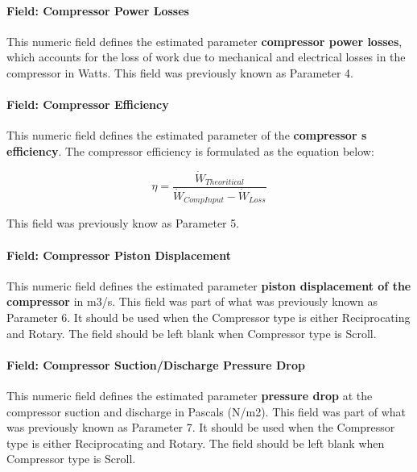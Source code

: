 \paragraph{Field: Compressor Power Losses}\label{field-compressor-power-losses}

This numeric field defines the estimated parameter \textbf{compressor power losses}, which accounts for the loss of work due to mechanical and electrical losses in the compressor in Watts. This field was previously known as Parameter 4.

\paragraph{Field: Compressor Efficiency}\label{field-compressor-efficiency}

This numeric field defines the estimated parameter of the \textbf{compressor s efficiency}. The compressor efficiency is formulated as the equation below:

\begin{equation}
\eta  = \frac{{{{\dot W}_{Theoritical}}}}{{{{\dot W}_{CompInput}} - {{\dot W}_{Loss}}}}
\end{equation}

This field was previously know as Parameter 5.

\paragraph{Field: Compressor Piston Displacement}\label{field-compressor-piston-displacement}

This numeric field defines the estimated parameter \textbf{piston displacement of the compressor} in m3/s. This field was part of what was previously known as Parameter 6. It should be used when the Compressor type is either Reciprocating and Rotary. The field should be left blank when Compressor type is Scroll.

\paragraph{Field: Compressor Suction/Discharge Pressure Drop}\label{field-compressor-suctiondischarge-pressure-drop}

This numeric field defines the estimated parameter \textbf{pressure drop} at the compressor suction and discharge in Pascals (N/m2). This field was part of what was previously known as Parameter 7. It should be used when the Compressor type is either Reciprocating and Rotary. The field should be left blank when Compressor type is Scroll.


